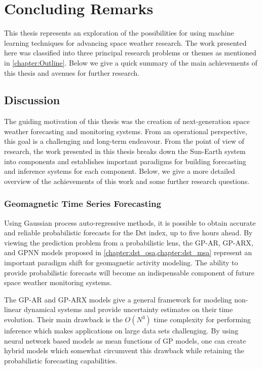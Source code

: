 \chapter{Concluding Remarks}\label{chapter:conclusions}

This thesis represents an exploration of the possibilities for using machine 
learning techniques for advancing space weather research. The work presented 
here was classified into three principal research problems or themes as 
mentioned in \cref{chapter:Outline}. Below we give a quick summary of the main 
achievements of this thesis and avenues for further research.

\section{Discussion}

The guiding motivation of this thesis was the creation of next-generation 
space weather forecasting and monitoring systems. From an operational 
perspective, this goal is a challenging and long-term endeavour. From the point 
of view of research, the work presented in this thesis breaks down the 
Sun-Earth system into components and establishes important paradigms for 
building forecasting and inference systems for each component. Below, we give a 
more detailed overview of the achievements of this work and some further 
research questions. 

\subsection*{Geomagnetic Time Series Forecasting}

Using Gaussian process auto-regressive methods, it is possible to obtain 
accurate and reliable probabilistic forecasts for the $\mathrm{Dst}$ index, 
up to five hours ahead. By viewing the prediction problem from a probabilistic 
lens, the GP-AR, GP-ARX, and GPNN models proposed in 
\cref{chapter:dst_osa,chapter:dst_msa} represent an important paradigm shift 
for geomagnetic activity modeling. The ability to provide probabilistic 
forecasts will become an indispensable component of future space weather 
monitoring systems.  

The GP-AR and GP-ARX models give a general framework for modeling non-linear 
dynamical systems and provide uncertainty estimates on their time evolution. 
Their main drawback is the $O(N^3)$ time complexity for performing inference 
which makes applications on large data sets challenging. By using neural 
network based models as mean functions of GP models, one can create hybrid 
models which somewhat circumvent this drawback while retaining the 
probabilistic forecasting capabilities.

